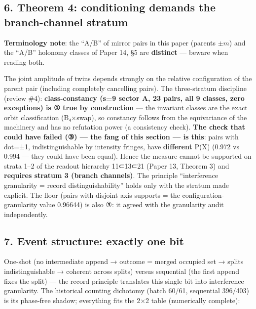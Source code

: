 \documentclass[
]{article}
\begin{document}
\subsection{6. Theorem 4: conditioning demands the branch-channel
stratum}\label{theorem-4-conditioning-demands-the-branch-channel-stratum}

\textbf{Terminology note}: the ``A/B'' of mirror pairs in this paper
(parents \(\pm m\)) and the ``A/B'' holonomy classes of Paper 14, §5 are
\textbf{distinct} --- beware when reading both.

The joint amplitude of twins depends strongly on the relative
configuration of the parent pair (including completely cancelling
pairs). The three-stratum discipline (review \#4):
\textbf{class-constancy (s=9 sector A, 23 pairs, all 9 classes, zero
exceptions) is ① true by construction} --- the invariant classes are the
exact orbit classification (B₄×swap), so constancy follows from the
equivariance of the machinery and has no refutation power (a consistency
check). \textbf{The check that could have failed (③) --- the fang of
this section --- is this}: pairs with dot=±1, indistinguishable by
intensity fringes, have \textbf{different} P(X) (0.972 vs 0.994 --- they
could have been equal). Hence the measure cannot be supported on strata
1--2 of the readout hierarchy 11⊂13⊂21 (Paper 13, Theorem 3) and
\textbf{requires stratum 3 (branch channels)}. The principle
``interference granularity = record distinguishability'' holds only with
the stratum made explicit. The floor (pairs with disjoint axis supports
= the configuration-granularity value 0.96644) is also ③: it agreed with
the granularity audit independently.

\subsection{7. Event structure: exactly one
bit}\label{event-structure-exactly-one-bit}

One-shot (no intermediate append → outcome = merged occupied set →
splits indistinguishable → coherent across splits) versus sequential
(the first append fixes the split) --- the record principle translates
this single bit into interference granularity. The historical counting
dichotomy (batch 60/61, sequential 396/403) is its phase-free shadow;
everything fits the 2×2 table (numerically complete):
\end{document}
